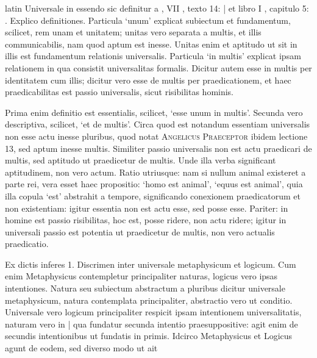 \begin{otherlanguage*}{latin}
\pstart
Universale in essendo sic definitur a , VII , texto 14:
 \textnormal{|} et libro I , capitulo 5:
. Explico definitiones. Particula `unum' explicat subiectum et fundamentum, scilicet, rem unam et unitatem; unitas vero separata a multis, et illis communicabilis, nam quod aptum est inesse. Unitas enim et aptitudo ut sit in illis est fundamentum relationis universalis. Particula `in multis' explicat ipsam relationem in qua consistit universalitas formalis. Dicitur autem esse in multis per identitatem cum illis; dicitur vero esse de multis per praedicationem, et haec praedicabilitas est passio universalis, sicut risibilitas hominis. 
\pend

\pstart
Prima enim definitio est essentialis, scilicet, `esse unum in multis'. Secunda vero descriptiva, scilicet, `et de multis'. Circa quod est notandum essentiam universalis non esse actu inesse pluribus, quod notat \textsc{Angelicus Praeceptor} ibidem lectione 13, sed aptum inesse multis. Similiter passio universalis non est actu praedicari de multis, sed aptitudo ut praedicetur de multis. Unde illa verba significant aptitudinem, non vero actum. Ratio utriusque:
nam si nullum animal existeret a parte rei, vera esset haec propositio:
`homo est animal', `equus est animal', quia illa copula `est' abstrahit a tempore, significando conexionem praedicatorum et non existentiam:
igitur essentia non est actu esse, sed posse esse. Pariter:
in homine est passio risibilitas, hoc est, posse ridere, non actu ridere; igitur in universali passio est potentia ut praedicetur de multis, non vero actualis praedicatio. 
\pend

\pstart
Ex dictis inferes 1. Discrimen inter universale metaphysicum et logicum. Cum enim Metaphysicus contempletur principaliter naturas, logicus vero ipsas intentiones. Natura seu subiectum abstractum a pluribus dicitur universale metaphysicum, natura contemplata principaliter, abstractio vero ut conditio. Universale vero logicum principaliter respicit ipsam intentionem universalitatis, naturam vero in \textnormal{|} qua fundatur secunda intentio praesuppositive:
agit enim de secundis intentionibus ut fundatis in primis. Idcirco Metaphysicus et Logicus agunt de eodem, sed diverso modo ut ait  
\pend


\end{otherlanguage*}
